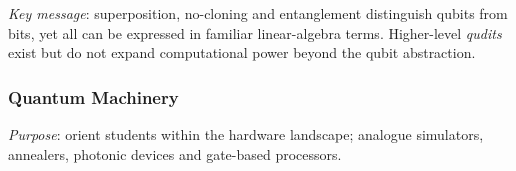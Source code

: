

\emph{Key message}: superposition, no-cloning and entanglement distinguish qubits from bits, 
yet all can be expressed in familiar linear-algebra terms. 
Higher-level \emph{qudits} exist but do not expand computational power beyond the qubit abstraction.

\subsubsection{Quantum Machinery}

\emph{Purpose}: orient students within the hardware landscape; analogue simulators, annealers, photonic devices and gate-based processors.


